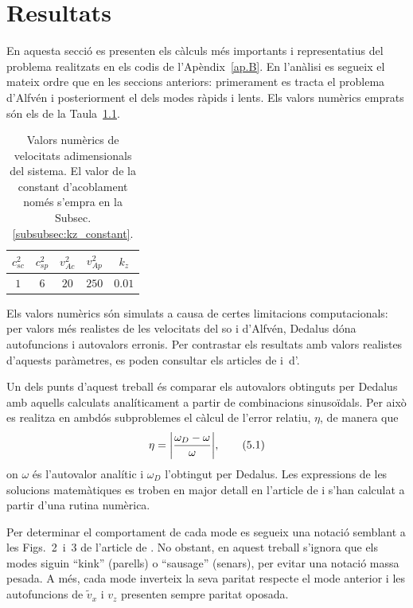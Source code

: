 
\chapter{Resultats} \label{sec:resultats}
En aquesta secció es presenten els càlculs més importants i representatius del problema realitzats en els codis de l'Apèndix~\ref{ap.B}.
En l'anàlisi es segueix el mateix ordre que en les seccions anteriors: primerament es tracta el problema d'Alfvén i posteriorment el dels modes ràpids i lents.
Els valors numèrics emprats són els de la Taula~\ref{tab:valors}.
\begin{table}[H]
	\centering
	\begin{tabular}{|c|c|c|c|c|}
		\hline
		$c_{s c}^2$ & $c_{s p}^2$ & $v_{A c}^2$ & $v_{A p}^2$ & $k_z$ \\
		\hline
		$1$ & $6$ & $20$ & $250$ & $0.01$ \\
		\hline
	\end{tabular}
	\caption{Valors numèrics de velocitats adimensionals del sistema.
	El valor de la constant d'acoblament només s'empra en la Subsec.\ref{subsubsec:kz_constant}.}
	\label{tab:valors}
\end{table}
\vspace{-10pt}
Els valors numèrics són simulats a causa de certes limitacions computacionals:
per valors més realistes de les velocitats del so i d'Alfvén,%
Dedalus dóna autofuncions i autovalors erronis.
Per contrastar els resultats amb valors realistes d'aquests paràmetres, es poden consultar els articles de \textcite{oscillation_modes_II} i~d'\textcite{oscillations_quiescent_solar_prominence}.

Un dels punts d'aquest treball és comparar els autovalors obtinguts per Dedalus amb aquells calculats analíticament a partir de combinacions sinusoïdals. %
Per això es realitza en ambdós subproblemes el càlcul de l'error relatiu, $\eta$, de manera que
\begin{equation}
	\eta = \abs{\frac{\omega_D - \omega}{\omega}}, \tag{5.1} \label{eq.5.1}
\end{equation}
on $\omega$ és l'autovalor analític i $\omega_D$ l'obtingut per Dedalus.
Les expressions de les solucions matemàtiques es troben en major detall en l'article de \textcite{oscillation_modes_II}
i s'han calculat a partir d'una rutina numèrica.

Per determinar el comportament de cada mode es segueix una notació semblant a les Figs.~2~i~3 de l'article de \textcite{oscillation_modes_II}.
No obstant, en aquest treball s'ignora que els modes siguin ``kink'' (parells) o ``sausage'' (senars), per evitar una notació massa pesada.
A més, cada mode inverteix la seva paritat respecte el mode anterior i les autofuncions de $\tilde{v}_{x}$ i $v_z$ presenten sempre paritat oposada.

